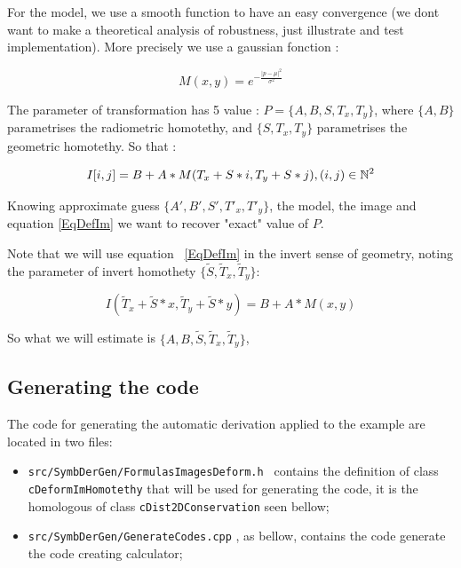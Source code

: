 For the model, we use  a smooth function to have an easy convergence (we dont want to 
make a theoretical analysis of robustness, just illustrate and test implementation).
More precisely we use a gaussian fonction :

\begin{equation}
	M(x,y) =  e^{-\frac{|p-\mu|^2}{\sigma^2}}
\end{equation}

The  parameter of transformation has 5 value :  $P=\{A,B,S,T_x,T_y\}$, where $\{A,B\}$ parametrises
the radiometric homotethy,  and $\{S,T_x,T_y\}$ parametrises the geometric homotethy.
So that :

\begin{equation}
	I[i,j] =  B + A * M(T_x + S*i,T_y+S*j) , (i,j) \in \mathbb{N}^2  \label{EqDefIm}
\end{equation}

Knowing approximate guess  $\{A',B',S',T'_x,T'_y\}$, the model, the image and equation
\ref{EqDefIm} we want to recover "exact" value of $P$.

Note that we will use equation ~\ref{EqDefIm} in the invert sense of geometry, noting
the parameter of invert homothety $\{\tilde{S},\tilde{T}_x,\tilde{T}_y\}$:

\begin{equation}
	I(\tilde{T}_x + \tilde{S}*x,\tilde{T}_y + \tilde{S}*y) =  B + A * M(x,y) \label{EqDefImInv}
\end{equation}

So what we will estimate is $\{A,B,\tilde{S},\tilde{T}_x,\tilde{T}_y\}$,


\subsection{Generating the code}

The code for generating the automatic derivation applied to the example are located in two files:

\begin{itemize}
    \item {\tt src/SymbDerGen/FormulasImagesDeform.h } contains the definition of  class 
              {\tt cDeformImHomotethy} that will be used for generating the code, it is the homologous
              of class  {\tt cDist2DConservation} seen bellow;

    \item {\tt src/SymbDerGen/GenerateCodes.cpp} , as bellow, contains the code generate the code
          creating calculator;

\end{itemize}

